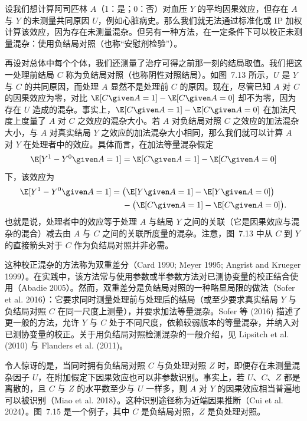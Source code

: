\begin{techpoint}[双重差分与负结局对照]
设我们想计算阿司匹林 $A$（1：是；0：否）对血压 $Y$ 的平均因果效应，但存在 $A$ 与 $Y$ 的未测量共同原因 $U$，例如心脏病史。那么我们就无法通过标准化或 IP 加权计算该效应，因为存在未测量混杂。但另有一种方法，在一定条件下可以校正未测量混杂：使用负结局对照（也称“安慰剂检验”）。

再设对总体中每个个体，我们还测量了治疗可得之前那一刻的结局取值。我们把这一处理前结局 $C$ 称为负结局对照（也称阴性对照结局）。如图~7.13 所示，$U$ 是 $Y$ 与 $C$ 的共同原因，而处理 $A$ 显然不是处理前 $C$ 的原因。现在，尽管已知 $A$ 对 $C$ 的因果效应为零，对比 $\E[C\given A=1]-\E[C\given A=0]$ 却不为零，因为存在 $U$ 造成的混杂。事实上，$\E[C\given A=1]-\E[C\given A=0]$ 在加法尺度上度量了 $A$ 对 $C$ 之效应的混杂大小。若 $A$ 对负结局对照 $C$ 之效应的加法混杂大小，与 $A$ 对真实结局 $Y$ 之效应的加法混杂大小相同，那么我们就可以计算 $A$ 对 $Y$ 在处理者中的效应。具体而言，在加法等量混杂假定
\[
\E[Y^{1}-Y^{0}\given A=1]=\E[C\given A=1]-\E[C\given A=0]
\]
下，该效应为
\[
\begin{aligned}
\E[Y^{1}-Y^{0}\given A=1]={}&\bigl(\E[Y\given A=1]-\E[Y\given A=0]\bigr)\\
&-\bigl(\E[C\given A=1]-\E[C\given A=0]\bigr).
\end{aligned}
\]
也就是说，处理者中的效应等于处理 $A$ 与结局 $Y$ 之间的关联（它是因果效应与混杂的混合）减去由 $A$ 与 $C$ 之间的关联所度量的混杂。注意，图~7.13 中从 $C$ 到 $Y$ 的直接箭头对于 $C$ 作为负结局对照并非必需。

这种校正混杂的方法称为双重差分（Card 1990; Meyer 1995; Angrist and Krueger 1999）。在实践中，该方法常与使用参数或半参数方法对已测协变量的校正结合使用（Abadie 2005）。然而，双重差分是负结局对照的一种略显局限的做法（Sofer et al. 2016）：它要求同时测量处理前与处理后的结局（或至少要求真实结局 $Y$ 与负结局对照 $C$ 在同一尺度上测量），并要求加法等量混杂。Sofer 等 (2016) 描述了更一般的方法，允许 $Y$ 与 $C$ 处于不同尺度，依赖较弱版本的等量混杂，并纳入对已测协变量的校正。关于用负结局对照检测混杂的一般介绍，见 Lipsitch et al. (2010) 与 Flanders et al. (2011)。

令人惊讶的是，当同时拥有负结局对照 $C$ 与负处理对照 $Z$ 时，即便存在未测量混杂因子 $U$，在附加假定下因果效应也可以非参数识别。事实上，若 $U$、$C$、$Z$ 都是离散的，且 $C$ 与 $Z$ 的水平数至少与 $U$ 一样多，则 $A$ 对 $Y$ 的因果效应相当普遍地可以被识别（Miao et al. 2018）。这种识别途径称为近端因果推断（Cui et al. 2024）。图~7.15 是一个例子，其中 $C$ 是负结局对照，$Z$ 是负处理对照。
\end{techpoint}

